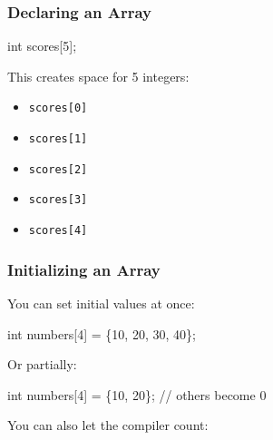 \documentclass[
  letterpaper,
  DIV=11,
  numbers=noendperiod]{scrreprt}
\newenvironment{Shaded}{\begin{snugshade}}{\end{snugshade}}
\newcommand{\CommentTok}[1]{\textcolor[rgb]{0.37,0.37,0.37}{#1}}
\newcommand{\DataTypeTok}[1]{\textcolor[rgb]{0.68,0.00,0.00}{#1}}
\newcommand{\DecValTok}[1]{\textcolor[rgb]{0.68,0.00,0.00}{#1}}
\newcommand{\NormalTok}[1]{\textcolor[rgb]{0.00,0.23,0.31}{#1}}
\newcommand{\OperatorTok}[1]{\textcolor[rgb]{0.37,0.37,0.37}{#1}}
\providecommand{\tightlist}{%
  \setlength{\itemsep}{0pt}\setlength{\parskip}{0pt}}
\begin{document}
\subsubsection{Declaring an Array}\label{declaring-an-array}

\begin{Shaded}
\begin{Highlighting}[]
\DataTypeTok{int}\NormalTok{ scores}\OperatorTok{[}\DecValTok{5}\OperatorTok{];}
\end{Highlighting}
\end{Shaded}

This creates space for 5 integers:

\begin{itemize}
\tightlist
\item
  \texttt{scores{[}0{]}}
\item
  \texttt{scores{[}1{]}}
\item
  \texttt{scores{[}2{]}}
\item
  \texttt{scores{[}3{]}}
\item
  \texttt{scores{[}4{]}}
\end{itemize}

\subsubsection{Initializing an Array}\label{initializing-an-array}

You can set initial values at once:

\begin{Shaded}
\begin{Highlighting}[]
\DataTypeTok{int}\NormalTok{ numbers}\OperatorTok{[}\DecValTok{4}\OperatorTok{]} \OperatorTok{=} \OperatorTok{\{}\DecValTok{10}\OperatorTok{,} \DecValTok{20}\OperatorTok{,} \DecValTok{30}\OperatorTok{,} \DecValTok{40}\OperatorTok{\};}
\end{Highlighting}
\end{Shaded}

Or partially:

\begin{Shaded}
\begin{Highlighting}[]
\DataTypeTok{int}\NormalTok{ numbers}\OperatorTok{[}\DecValTok{4}\OperatorTok{]} \OperatorTok{=} \OperatorTok{\{}\DecValTok{10}\OperatorTok{,} \DecValTok{20}\OperatorTok{\};}  \CommentTok{// others become 0}
\end{Highlighting}
\end{Shaded}

You can also let the compiler count:
\end{document}
